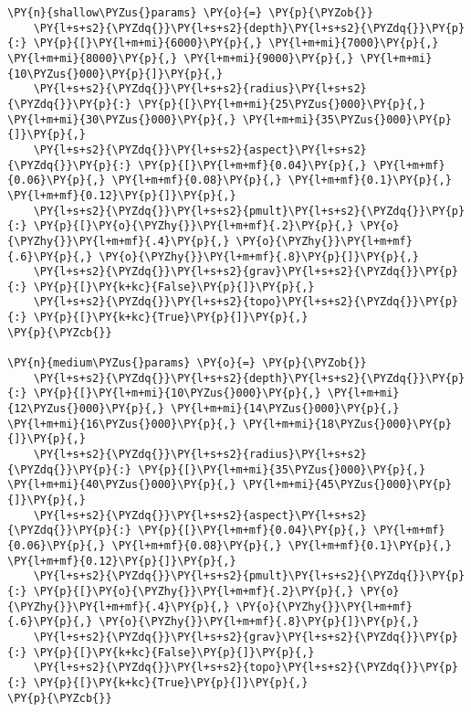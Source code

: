     \begin{tcolorbox}[breakable, size=fbox, boxrule=1pt, pad at break*=1mm,colback=cellbackground, colframe=cellborder]
\begin{Verbatim}[commandchars=\\\{\}]
\PY{n}{shallow\PYZus{}params} \PY{o}{=} \PY{p}{\PYZob{}}
    \PY{l+s+s2}{\PYZdq{}}\PY{l+s+s2}{depth}\PY{l+s+s2}{\PYZdq{}}\PY{p}{:} \PY{p}{[}\PY{l+m+mi}{6000}\PY{p}{,} \PY{l+m+mi}{7000}\PY{p}{,} \PY{l+m+mi}{8000}\PY{p}{,} \PY{l+m+mi}{9000}\PY{p}{,} \PY{l+m+mi}{10\PYZus{}000}\PY{p}{]}\PY{p}{,}
    \PY{l+s+s2}{\PYZdq{}}\PY{l+s+s2}{radius}\PY{l+s+s2}{\PYZdq{}}\PY{p}{:} \PY{p}{[}\PY{l+m+mi}{25\PYZus{}000}\PY{p}{,} \PY{l+m+mi}{30\PYZus{}000}\PY{p}{,} \PY{l+m+mi}{35\PYZus{}000}\PY{p}{]}\PY{p}{,}
    \PY{l+s+s2}{\PYZdq{}}\PY{l+s+s2}{aspect}\PY{l+s+s2}{\PYZdq{}}\PY{p}{:} \PY{p}{[}\PY{l+m+mf}{0.04}\PY{p}{,} \PY{l+m+mf}{0.06}\PY{p}{,} \PY{l+m+mf}{0.08}\PY{p}{,} \PY{l+m+mf}{0.1}\PY{p}{,} \PY{l+m+mf}{0.12}\PY{p}{]}\PY{p}{,}
    \PY{l+s+s2}{\PYZdq{}}\PY{l+s+s2}{pmult}\PY{l+s+s2}{\PYZdq{}}\PY{p}{:} \PY{p}{[}\PY{o}{\PYZhy{}}\PY{l+m+mf}{.2}\PY{p}{,} \PY{o}{\PYZhy{}}\PY{l+m+mf}{.4}\PY{p}{,} \PY{o}{\PYZhy{}}\PY{l+m+mf}{.6}\PY{p}{,} \PY{o}{\PYZhy{}}\PY{l+m+mf}{.8}\PY{p}{]}\PY{p}{,}
    \PY{l+s+s2}{\PYZdq{}}\PY{l+s+s2}{grav}\PY{l+s+s2}{\PYZdq{}}\PY{p}{:} \PY{p}{[}\PY{k+kc}{False}\PY{p}{]}\PY{p}{,}
    \PY{l+s+s2}{\PYZdq{}}\PY{l+s+s2}{topo}\PY{l+s+s2}{\PYZdq{}}\PY{p}{:} \PY{p}{[}\PY{k+kc}{True}\PY{p}{]}\PY{p}{,}
\PY{p}{\PYZcb{}}

\PY{n}{medium\PYZus{}params} \PY{o}{=} \PY{p}{\PYZob{}}
    \PY{l+s+s2}{\PYZdq{}}\PY{l+s+s2}{depth}\PY{l+s+s2}{\PYZdq{}}\PY{p}{:} \PY{p}{[}\PY{l+m+mi}{10\PYZus{}000}\PY{p}{,} \PY{l+m+mi}{12\PYZus{}000}\PY{p}{,} \PY{l+m+mi}{14\PYZus{}000}\PY{p}{,} \PY{l+m+mi}{16\PYZus{}000}\PY{p}{,} \PY{l+m+mi}{18\PYZus{}000}\PY{p}{]}\PY{p}{,}
    \PY{l+s+s2}{\PYZdq{}}\PY{l+s+s2}{radius}\PY{l+s+s2}{\PYZdq{}}\PY{p}{:} \PY{p}{[}\PY{l+m+mi}{35\PYZus{}000}\PY{p}{,} \PY{l+m+mi}{40\PYZus{}000}\PY{p}{,} \PY{l+m+mi}{45\PYZus{}000}\PY{p}{]}\PY{p}{,}
    \PY{l+s+s2}{\PYZdq{}}\PY{l+s+s2}{aspect}\PY{l+s+s2}{\PYZdq{}}\PY{p}{:} \PY{p}{[}\PY{l+m+mf}{0.04}\PY{p}{,} \PY{l+m+mf}{0.06}\PY{p}{,} \PY{l+m+mf}{0.08}\PY{p}{,} \PY{l+m+mf}{0.1}\PY{p}{,} \PY{l+m+mf}{0.12}\PY{p}{]}\PY{p}{,}
    \PY{l+s+s2}{\PYZdq{}}\PY{l+s+s2}{pmult}\PY{l+s+s2}{\PYZdq{}}\PY{p}{:} \PY{p}{[}\PY{o}{\PYZhy{}}\PY{l+m+mf}{.2}\PY{p}{,} \PY{o}{\PYZhy{}}\PY{l+m+mf}{.4}\PY{p}{,} \PY{o}{\PYZhy{}}\PY{l+m+mf}{.6}\PY{p}{,} \PY{o}{\PYZhy{}}\PY{l+m+mf}{.8}\PY{p}{]}\PY{p}{,}
    \PY{l+s+s2}{\PYZdq{}}\PY{l+s+s2}{grav}\PY{l+s+s2}{\PYZdq{}}\PY{p}{:} \PY{p}{[}\PY{k+kc}{False}\PY{p}{]}\PY{p}{,}
    \PY{l+s+s2}{\PYZdq{}}\PY{l+s+s2}{topo}\PY{l+s+s2}{\PYZdq{}}\PY{p}{:} \PY{p}{[}\PY{k+kc}{True}\PY{p}{]}\PY{p}{,}
\PY{p}{\PYZcb{}}


\end{Verbatim}
\end{tcolorbox}
